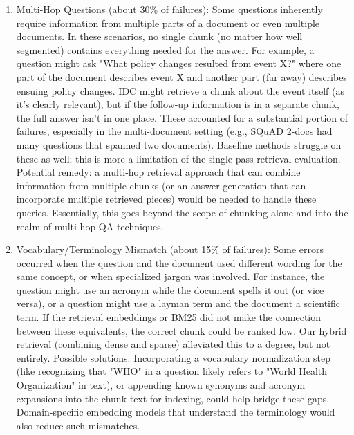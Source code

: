 \documentclass[12pt,a4paper]{report}
\begin{document}
\begin{enumerate}
\item Multi-Hop Questions (about 30\% of failures): Some questions inherently require information from multiple parts of a document or even multiple documents. In these scenarios, no single chunk (no matter how well segmented) contains everything needed for the answer. For example, a question might ask "What policy changes resulted from event X?" where one part of the document describes event X and another part (far away) describes ensuing policy changes. IDC might retrieve a chunk about the event itself (as it's clearly relevant), but if the follow-up information is in a separate chunk, the full answer isn't in one place. These accounted for a substantial portion of failures, especially in the multi-document setting (e.g., SQuAD 2-docs had many questions that spanned two documents). Baseline methods struggle on these as well; this is more a limitation of the single-pass retrieval evaluation. Potential remedy: a multi-hop retrieval approach that can combine information from multiple chunks (or an answer generation that can incorporate multiple retrieved pieces) would be needed to handle these queries. Essentially, this goes beyond the scope of chunking alone and into the realm of multi-hop QA techniques.

\item Vocabulary/Terminology Mismatch (about 15\% of failures): Some errors occurred when the question and the document used different wording for the same concept, or when specialized jargon was involved. For instance, the question might use an acronym while the document spells it out (or vice versa), or a question might use a layman term and the document a scientific term. If the retrieval embeddings or BM25 did not make the connection between these equivalents, the correct chunk could be ranked low. Our hybrid retrieval (combining dense and sparse) alleviated this to a degree, but not entirely. Possible solutions: Incorporating a vocabulary normalization step (like recognizing that "WHO" in a question likely refers to "World Health Organization" in text), or appending known synonyms and acronym expansions into the chunk text for indexing, could help bridge these gaps. Domain-specific embedding models that understand the terminology would also reduce such mismatches.


\end{enumerate}
\end{document}
